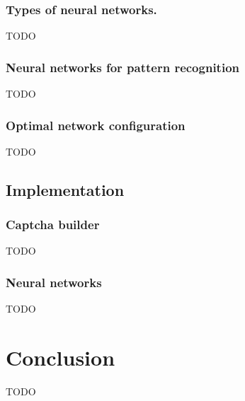 \documentclass[pdftex,a4paper,12pt,twoside]{report}
\begin{document}
\subsection{Types of neural networks.}
TODO
\subsection{Neural networks for pattern recognition}
TODO
\subsection{Optimal network configuration}
TODO
\section{Implementation}
\label{sec:implementation}
\subsection{Captcha builder}
TODO
\subsection{Neural networks}
TODO
\chapter{Conclusion}
\label{ch:conclusie}
TODO
%
%
\appendix
%
%
%


%
%
%
%
\end{document}
